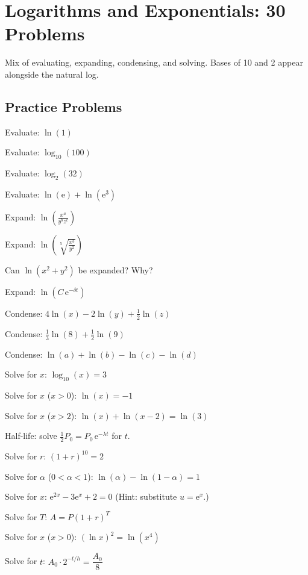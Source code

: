 \chapter{Logarithms and Exponentials: 30 Problems}

Mix of evaluating, expanding, condensing, and solving. Bases of 10 and 2
appear alongside the natural log.

\section{Practice Problems}

\begin{problems}
  \item Evaluate: $\ln(1)$
  \item Evaluate: $\log_{10}(100)$
  \item Evaluate: $\log_{2}(32)$
  \item Evaluate: $\ln(\mathrm{e})+\ln(\mathrm{e}^{3})$
  \item Expand: $\displaystyle\ln\left(\frac{x^{a}}{y^{b}z^{c}}\right)$
  \item Expand: $\displaystyle\ln\left(\sqrt[5]{\frac{x^{3}}{y^{2}}}\right)$
  \item Can $\ln(x^{2}+y^{2})$ be expanded? Why?
  \item Expand: $\ln(C\,\mathrm{e}^{-\delta t})$
  \item Condense: $4\ln(x)-2\ln(y)+\tfrac12\ln(z)$
  \item Condense: $\tfrac13\ln(8)+\tfrac12\ln(9)$
  \item Condense: $\ln(a)+\ln(b)-\ln(c)-\ln(d)$
  \item Solve for $x$: $\log_{10}(x)=3$
  \item Solve for $x$ ($x>0$): $\ln(x)=-1$
  \item Solve for $x$ ($x>2$): $\ln(x)+\ln(x-2)=\ln(3)$
  \item Half-life: solve $\tfrac12 P_{0}=P_{0}\,\mathrm{e}^{-\lambda t}$ for
        $t$.
  \item Solve for $r$: $(1+r)^{10}=2$
  \item Solve for $\alpha$ ($0<\alpha<1$): $\ln(\alpha)-\ln(1-\alpha)=1$
  \item Solve for $x$: $\mathrm{e}^{2x}-3\mathrm{e}^{x}+2=0$ (Hint:
        substitute $u=\mathrm{e}^{x}$.)
  \item Solve for $T$: $A=P(1+r)^{T}$
  \item Solve for $x$ ($x>0$): $(\ln x)^{2}=\ln(x^{4})$
  \item Solve for $t$: $A_{0}\cdot 2^{-t/h}=\dfrac{A_{0}}{8}$

\end{problems}
